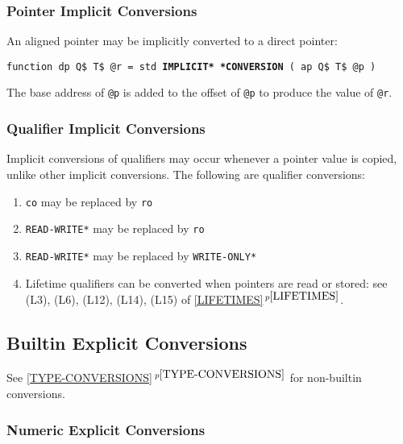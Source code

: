 \documentclass[12pt]{article}
\newcommand{\ttkey}[1]{{\tt \bfseries #1}}
\newcommand{\itemref}[1]{\ref{#1}$\,^{p\pageref{#1}}$}
\newenvironment{indpar}[1][0.3in]%
	{\begin{list}{}%
		     {\setlength{\itemsep}{0in}%
		      \setlength{\topsep}{0in}%
		      \setlength{\parsep}{1ex}%
		      \setlength{\labelwidth}{#1}%
		      \setlength{\leftmargin}{#1}%
		      \addtolength{\leftmargin}{\labelsep}}%
	 \item}%
	{\end{list}}
\begin{document}
\subsubsection{Pointer Implicit Conversions}
\label{POINTER-IMPLICIT-CONVERSIONS}

An aligned pointer may be implicitly converted to a direct pointer:

\begin{indpar}
{\tt function dp Q\$ T\$ @r =
    std \ttkey{*IMPLICIT* *CONVERSION} ( ap Q\$ T\$ @p )}
\begin{indpar}
The base address of {\tt @p} is added to the offset of {\tt @p} to
produce the value of {\tt @r}.
\end{indpar}
\end{indpar}

\subsubsection{Qualifier Implicit Conversions}
\label{QUALIFIER-IMPLICIT-CONVERSIONS}

Implicit conversions of qualifiers may occur whenever a pointer
value is copied, unlike other implicit conversions.
The following are qualifier conversions:
\begin{indpar}
\begin{enumerate}
\item {\tt co} may be replaced by {\tt ro}
\item {\tt *READ-WRITE*} may be replaced by {\tt ro}
\item {\tt *READ-WRITE*} may be replaced by {\tt *WRITE-ONLY*}
\item Lifetime qualifiers can be converted when pointers are read or
stored: see (L3), (L6), (L12), (L14), (L15) of \itemref{LIFETIMES}.

\end{enumerate}
\end{indpar}

\subsection{Builtin Explicit Conversions}
\label{BUILTIN-EXPLICIT-CONVERSIONS}

See \itemref{TYPE-CONVERSIONS} for non-builtin conversions.

\subsubsection{Numeric Explicit Conversions}
\end{document}
